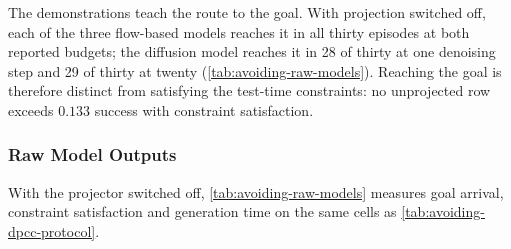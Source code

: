 The demonstrations teach the route to the goal. With projection switched off, each of the three
flow-based models reaches it in all thirty episodes at both reported budgets; the diffusion model
reaches it in 28 of thirty at one denoising step and 29 of thirty at twenty
(\autoref{tab:avoiding-raw-models}). Reaching the goal is therefore distinct from satisfying the
test-time constraints: no unprojected row exceeds $0.133$ success with constraint satisfaction.

\subsubsection{Raw Model Outputs}\label{sec:res:avoiding:raw}

With the projector switched off, \autoref{tab:avoiding-raw-models} measures goal arrival, constraint satisfaction and generation time on the same cells as \autoref{tab:avoiding-dpcc-protocol}.

